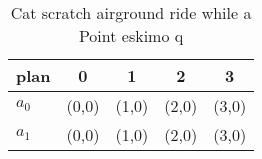 \documentclass[a4paper]{article}
\begin{document}
\begin{table}
\begin{adjustbox}{width=0.7\columnwidth}
\begin{tabular}{|l|l|l|l|l|}
\hline
\textbf{plan} & \multicolumn{1}{c|}{\textbf{0}} & \multicolumn{1}{c|}{\textbf{1}} & \multicolumn{1}{c|}{\textbf{2}} & \multicolumn{1}{c|}{\textbf{3}} \\ \hline
\textbf{$a_0$}  & (0,0) & (1,0) & (2,0) & (3,0) \\ \hline
\textbf{$a_1$}  & (0,0) & (1,0) & (2,0) & (3,0) \\ \hline
\end{tabular}
\end{adjustbox}
\caption{Cat scratch airground ride while a Point eskimo q
}
\end{table}
\end{document}
